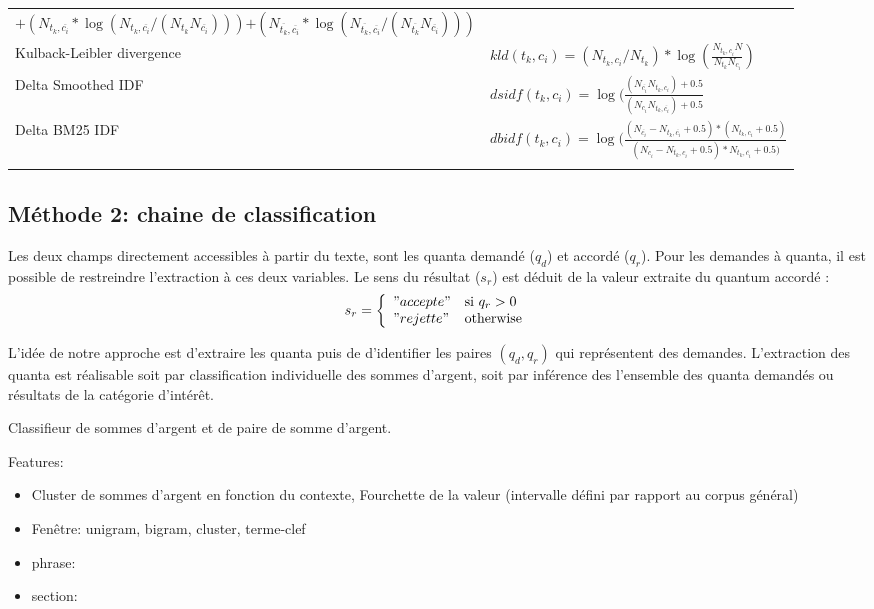 \begin{table}
\begin{tabular}{p{}@{\hskip 0.2in}p{}}
\begin{equation*}
{{+ (N_{t_k,\overline{c_i}} * \log (N_{t_k,\overline{c_i}} / (N_{t_k}N_{\overline{c_i}})))}}
{+ (N_{\overline{t_k},\overline{c_i}} * \log (N_{\overline{t_k},\overline{c_i}} / (N_{\overline{t_k}}N_{\overline{c_i}})))}
\end{equation*} \\ \noalign{\smallskip}
 Kulback-Leibler divergence & $kld(t_k, c_i)=(N_{t_k,c_i} / N_{t_k}) * \log (\frac{N_{t_k,c_i} N}{N_{t_k}N_{c_i}})$\\ \noalign{\smallskip}
 Delta Smoothed IDF & $dsidf(t_k, c_i)=\log (\frac{(N_{\overline{c_i}}N_{t_k,c_i}) + 0.5}{(N_{c_i}N_{t_k,\overline{c_i}}) + 0.5} $\\ \noalign{\smallskip}
 Delta BM25 IDF \cite{jones2000bm25idf} & $dbidf(t_k, c_i) = \log (\frac{(N_{\overline{c_i}} - N_{t_k,\overline{c_i}} + 0.5) * (N_{t_k,c_i} + 0.5)}{(N_{c_i} - N_{t_k,c_i} + 0.5) * N_{t_k,\overline{c_i}} + 0.5)} $\\ \noalign{\smallskip}
\hline
\end{tabular}
\end{table}


\subsection{Méthode 2: chaine de classification}
Les deux champs directement accessibles à partir du texte, sont les quanta demandé ($q_d$) et accordé ($q_r$). Pour les demandes à quanta, il est possible de restreindre l'extraction à ces deux variables. Le sens du résultat ($s_r$) est déduit de la valeur extraite du quantum accordé : \[s_r = \left\lbrace \begin{array}{ll}
"accepte" & \text{si } q_r > 0 \\
"rejette" & \text{otherwise} \end{array} \right.\]

L'idée de notre approche est d'extraire les quanta puis de d'identifier les paires $(q_d, q_r)$ qui représentent des demandes. L'extraction des quanta est réalisable soit par classification individuelle des sommes d'argent, soit par inférence des l'ensemble des quanta demandés ou résultats de la catégorie d'intérêt. 


Classifieur de sommes d'argent et de paire de somme d'argent. 

Features:
\begin{itemize}
    \item Cluster de sommes d'argent en fonction du contexte, Fourchette de la valeur (intervalle défini par rapport au corpus général)
    \item Fenêtre: unigram, bigram, cluster, terme-clef
    \item phrase: 
    \item section:
\end{itemize}

